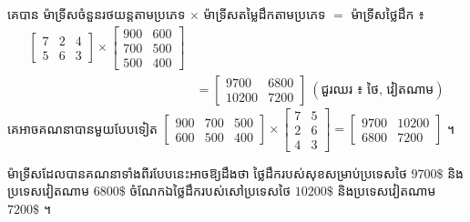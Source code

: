 គេបាន ម៉ាទ្រីសចំនួនរថយន្តតាមប្រភេទ $\times$ ម៉ាទ្រីសតម្លៃដឹកតាមប្រភេទ $=$ ម៉ាទ្រីសថ្លៃដឹក ៖
\[
\begin{aligned}
\begin{bmatrix} 7 & 2 & 4\\ 5 & 6 & 3 \end{bmatrix} \times \begin{bmatrix} 900 & 600\\ 700 & 500\\ 500 & 400 \end{bmatrix} &\\
&= \begin{bmatrix} 9700 & 6800\\ 10200 & 7200 \end{bmatrix} \ (\text{ជួរឈរ ៖ ថៃ, វៀតណាម})
\end{aligned}
\]
គេអាចគណនាបានមួយបែបទៀត $\begin{bmatrix} 900 & 700 & 500\\ 600 & 500 & 400 \end{bmatrix} \times \begin{bmatrix} 7 & 5\\ 2 & 6\\ 4 & 3 \end{bmatrix} = \begin{bmatrix} 9700 & 10200\\ 6800 & 7200 \end{bmatrix}$ ។

ម៉ាទ្រីសដែលបានគណនាទាំងពីរបែបនេះអាចឱ្យដឹងថា ថ្លៃដឹករបស់សុខសម្រាប់ប្រទេសថៃ $9700\$$ និងប្រទេសវៀតណាម $6800\$$ ចំណែកឯថ្លៃដឹករបស់សៅប្រទេសថៃ $10200\$$ និងប្រទេសវៀតណាម $7200\$$ ។

